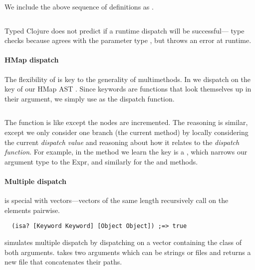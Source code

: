 We include the above sequence of definitions as .

\begin{Code}
\begin{exmp}
\inputminted[firstline=5,lastline=10]{clojure}{code/demo/src/demo/rep.clj}
\label{example:rep}
\end{exmp}
\end{Code}

Typed Clojure does not predict if a runtime dispatch will be successful--- 
type checks because  agrees with the parameter type ,
but throws an error at runtime.

\paragraph{HMap dispatch} The flexibility of  is key to the generality of multimethods. 
In  we
dispatch on the  key 
of our HMap AST .
Since keywords are functions that look themselves up in their argument, we simply
use  as the dispatch function.

\begin{exmp}
\inputminted[firstline=5,lastline=18]{clojure}{code/demo/src/demo/eg5.clj}
\label{example:incmap}
\end{exmp}

The function  is like  except the nodes are incremented.
The reasoning is similar, except we only consider one branch (the current method) by
locally considering the current \emph{dispatch value} and reasoning about how it relates
to the \emph{dispatch function}.
For example, 
in the  method we learn the  key is a , which
narrows our argument type to the  Expr, and similarly for the 
and  methods.

\paragraph{Multiple dispatch}  is special with vectors---vectors of the
same length recursively call  on the elements pairwise.
\begin{verbatim}
  (isa? [Keyword Keyword] [Object Object]) ;=> true
\end{verbatim}

simulates multiple dispatch by dispatching on
a vector containing the class of both arguments. 
takes two arguments which can be strings or files and returns
a new file that concatenates their paths.

